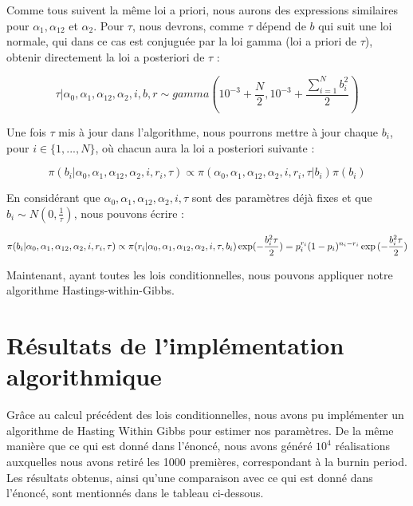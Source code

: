 \documentclass[
]{article}
\begin{document}
Comme tous suivent la même loi a priori, nous aurons des expressions
similaires pour \(\alpha_1, \alpha_{12}\) et \(\alpha_2\). Pour
\(\tau\), nous devrons, comme \(\tau\) dépend de \(b\) qui suit une loi
normale, qui dans ce cas est conjuguée par la loi gamma (loi a priori de
\(\tau\)), obtenir directement la loi a posteriori de \(\tau\) :

\[
  \tau|\alpha_0, \alpha_{1}, \alpha_{12},\alpha_2, i , b, r \sim gamma(10^{-3} + \frac{N}{2}, 10^{-3} + \frac{\sum_{i=1}^Nb_i^2}{2})
\]

Une fois \(\tau\) mis à jour dans l'algorithme, nous pourrons mettre à
jour chaque \(b_i\), pour \(i \in \{1, ..., N\}\), où chacun aura la loi
a posteriori suivante :

\[
  \pi(b_i| \alpha_0, \alpha_{1}, \alpha_{12},\alpha_2, i , r_i, \tau) \propto \pi( \alpha_0, \alpha_{1}, \alpha_{12},\alpha_2, i , r_i, \tau| b_i)\pi(b_i)
\]

En considérant que
\(\alpha_0, \alpha_{1}, \alpha_{12},\alpha_2, i, \tau\) sont des
paramètres déjà fixes et que \(b_i \sim N(0,\frac{1}{\tau})\), nous
pouvons écrire :

\[
  \pi(b_i| \alpha_0, \alpha_{1}, \alpha_{12},\alpha_2, i , r_i, \tau) \propto \pi(r_i|\alpha_0, \alpha_{1}, \alpha_{12},\alpha_2, i , \tau, b_i)\exp(-\frac{b_i^2\tau}{2}) \\
  =p_i^{r_i}(1-p_i)^{n_i-r_i}\exp{(-\frac{b_i^2\tau}{2})}
\]

Maintenant, ayant toutes les lois conditionnelles, nous pouvons
appliquer notre algorithme Hastings-within-Gibbs.

\hypertarget{ruxe9sultats-de-limpluxe9mentation-algorithmique}{%
\section{Résultats de l'implémentation
algorithmique}\label{ruxe9sultats-de-limpluxe9mentation-algorithmique}}

Grâce au calcul précédent des lois conditionnelles, nous avons pu
implémenter un algorithme de Hasting Within Gibbs pour estimer nos
paramètres. De la même manière que ce qui est donné dans l'énoncé, nous
avons généré \(10^4\) réalisations auxquelles nous avons retiré les 1000
premières, correspondant à la burnin period. Les résultats obtenus,
ainsi qu'une comparaison avec ce qui est donné dans l'énoncé, sont
mentionnés dans le tableau ci-dessous.
\end{document}
